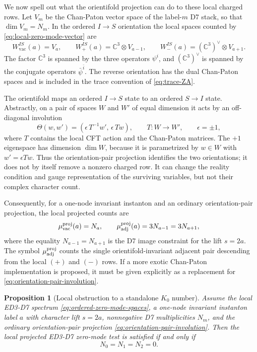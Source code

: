 \documentclass[11pt]{article}
\newcommand{\C}{\mathbb{C}}
\newcommand{\vac}{\mathrm{vac}}
\newtheorem{proposition}{Proposition}
\begin{document}
We now spell out what the orientifold projection can do to these local charged rows. Let
$V_m$ be the Chan-Paton vector space of the label-$m$ D7 stack, so that
$\dim V_m=N_m$. In the ordered $I\to S$ orientation the local spaces counted by
\eqref{eq:local-zero-mode-vector} are
\begin{equation}
  W_{\vac}^{IS}(a)=V_a,\qquad
  W_+^{IS}(a)=\C^3\otimes V_{a-1},\qquad
  W_-^{IS}(a)=(\C^3)^\vee\otimes V_{a+1}.
  \label{eq:ordered-zero-mode-spaces}
\end{equation}
The factor $\C^3$ is spanned by the three operators $\psi^i$, and $(\C^3)^\vee$ is spanned by
the conjugate operators $\bar\psi^{\bar i}$. The reverse orientation has the dual Chan-Paton
spaces and is included in the trace convention of \eqref{eq:trace-ZA}.

The orientifold maps an ordered $I\to S$ state to an ordered $S\to I$ state. Abstractly, on a
pair of spaces $W$ and $W'$ of equal dimension it acts by an off-diagonal involution
\begin{equation}
  \Theta(w,w')=(\epsilon\,T^{-1}w',\,\epsilon\,T w),
  \qquad
  T:W\longrightarrow W',
  \qquad
  \epsilon=\pm 1,
  \label{eq:orientation-pair-involution}
\end{equation}
where $T$ contains the local CFT action and the Chan-Paton matrices. The $+1$ eigenspace has
dimension $\dim W$, because it is parametrized by $w\in W$ with $w'=\epsilon T w$. Thus the
orientation-pair projection identifies the two orientations; it does not by itself remove a
nonzero charged row. It can change the reality condition and gauge representation of the
surviving variables, but not their complex character count.

Consequently, for a one-node invariant instanton and an ordinary orientation-pair projection,
the local projected counts are
\begin{equation}
  \mu_{\vac}^{\rm proj}(a)=N_a,
  \qquad
  \mu_{\rm adj}^{\rm proj}(a)=3N_{a-1}=3N_{a+1},
  \label{eq:ordinary-projected-counts}
\end{equation}
where the equality $N_{a-1}=N_{a+1}$ is the D7 image constraint for the lift $s=2a$. The symbol
$\mu_{\rm adj}^{\rm proj}$ counts the single orientifold-invariant adjacent pair descending from
the local $(+)$ and $(-)$ rows. If a more exotic Chan-Paton implementation is proposed, it must be
given explicitly as a replacement for \eqref{eq:orientation-pair-involution}.

\begin{proposition}[Local obstruction to a standalone \(K_0\) number]
\label{prop:local-obstruction-pure-scalar}
Assume the local ED3-D7 spectrum \eqref{eq:ordered-zero-mode-spaces}, a one-node invariant
instanton label $a$ with character lift $s=2a$, nonnegative D7 multiplicities $N_m$, and the
ordinary orientation-pair projection \eqref{eq:orientation-pair-involution}. Then the local
projected ED3-D7 zero-mode test is satisfied if and only if
\begin{equation}
  N_0=N_1=N_2=0.
  \label{eq:ordinary-projection-pureK0-noD7}
\end{equation}
\end{proposition}
\end{document}
